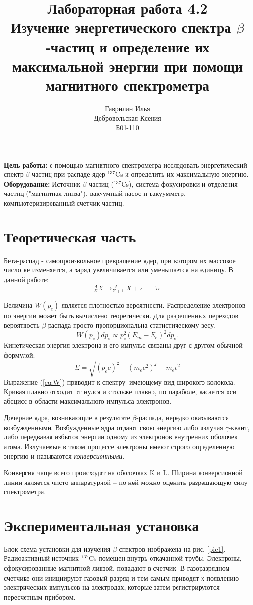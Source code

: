\documentclass[a4paper,12pt]{article} %
\author{Гаврилин Илья\\
		Добровольская Ксения\\
	Б01-110}
\title{\textbf{Лабораторная работа 4.2\\ 
		 Изучение энергетического спектра $\beta$-частиц и определение их максимальной энергии при помощи магнитного спектрометра}}
\begin{document}
	\maketitle
	\textbf{Цель работы:} с помощью магнитного спектрометра исследовать энергетический спектр $\beta$-частиц при распаде ядер $^{137}$Cs и определить их максимальную энергию.
	\textbf{Оборудование:} Источник $\beta$ частиц ($^{137}$Cs), система фокусировки и отделения частиц ("магнитная линза"), вакуумный насос и вакуумметр, компьютеризированный счетчик частиц.
	
	\section{Теоретическая часть}
	
	Бета-распад - самопроизвольное превращение ядер, при котором их массовое число не изменяется, а заряд увеличивается или уменьшается на единицу.
	В данной работе:
	$$^A_Z X \to ^{\ \, A}_{Z+1} X + e^- + \widetilde{\nu} .$$
	
	Величина $W(p_e)$ является плотностью вероятности. Распределение электронов по энергии может быть вычислено теоретически. Для разрешенных переходов вероятность $\beta$-распада просто пропорциональна статистическому весу.
	\begin{equation*}
		\label{eq:W}
		W(p_e)dp_e \propto p_e^2(E_m-E_e)^2 dp_e.
	\end{equation*}
	Кинетическая энергия электрона и его импульс связаны друг с другом обычной формулой:
	\begin{equation*}
		E = \sqrt{(p_ec)^2+(m_ec^2)^2}-m_ec^2
	\end{equation*}
	Выражение (\ref{eq:W}) приводит к спектру, имеющему вид широкого колокола. Кривая плавно отходит от нулся и стольже плавно, по параболе, касается оси абсцисс в области максимального импульса электронов.
	
	Дочерние ядра, возникающие в результате $\beta$-распада, нередко оказываются возбужденными. Возбужденные ядра отдают свою энергию либо излучая $\gamma$-квант, либо передвавая избыток энергии одному из электронов внутренних оболочек атома. Излучаемые в таком процессе электроны имеют строго определенную энергию и называются \textit{конверсионными}.
	
	Конверсия чаще всего происходит на оболочках K и L. Ширина конверсионной линии является чисто аппаратурной -- по ней можно оценить разрешающую силу спектрометра.
	
	\section{Экспериментальная установка}
	Блок-схема установки для изучения $\beta$-спектров изображена на рис. \ref{pic1}. Радиоактивный источник $^{137}$Cs помещен внутрь откачанной трубы. Электроны, сфокусированные магнитной линзой, попадают в счетчик. В газоразрядном счетчике они инициируют газовый разряд и тем самым приводят к появлению электрических импульсов на электродах, которые затем регистрируются пересчетным прибором.
	
\end{document}
